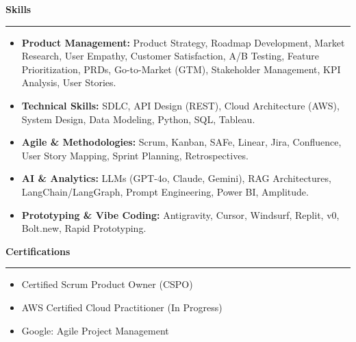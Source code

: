 \documentclass[9pt,letterpaper]{article} %
\newenvironment{rSection}[1]{ %
  \sectionskip
 \textbf{\Large #1} %
  \sectionlineskip
  \hrule %
  \begin{list}{}{ %
    \setlength{\leftmargin}{-0em} %
  }
  \item[]
}{
  \end{list}
}
\def\sectionlineskip{\smallskip} %
\def\sectionskip{} %
\begin{document}
\begin{rSection}{Skills}
\item[] \vspace{-0.5em}
\begin{itemize}[left=-1.5em, labelsep=.1cm, labelwidth=.2cm, itemsep=0.0em]

    \item \textbf{ Product Management:} Product Strategy, Roadmap Development, Market Research, User Empathy, Customer Satisfaction, A/B Testing, Feature Prioritization, PRDs, Go-to-Market (GTM), Stakeholder Management, KPI Analysis, User Stories.

    \item \textbf{ Technical Skills:} SDLC, API Design (REST), Cloud Architecture (AWS), System Design, Data Modeling, Python, SQL, Tableau.

    \item \textbf{ Agile \& Methodologies:} Scrum, Kanban, SAFe, Linear, Jira, Confluence, User Story Mapping, Sprint Planning, Retrospectives.

    \item \textbf{ AI \& Analytics:} LLMs (GPT-4o, Claude, Gemini), RAG Architectures, LangChain/LangGraph, Prompt Engineering, Power BI, Amplitude.

    \item \textbf{ Prototyping \& Vibe Coding:} Antigravity, Cursor, Windsurf, Replit, v0, Bolt.new, Rapid Prototyping.

\end{itemize}
\end{rSection}

\begin{rSection}{Certifications}
\item[] \vspace{-1em}
\begin{itemize}[left=-1.5em, labelsep=.1cm, labelwidth=.2cm, itemsep=0.0em]

\item Certified Scrum Product Owner (CSPO)

\item AWS Certified Cloud Practitioner (In Progress)

\item Google: Agile Project Management

\end{itemize}
\end{rSection}
\end{document}
